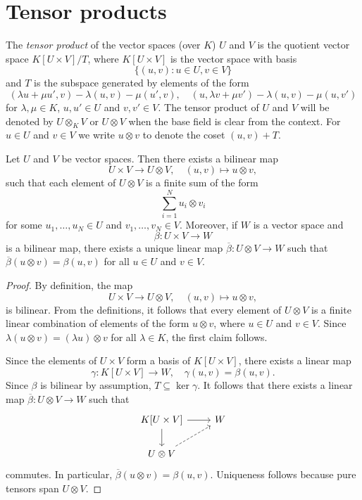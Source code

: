 \section{Tensor products}

The \emph{tensor product} of the vector spaces (over $K$) $U$ and $V$ 
is the quotient vector space $K[U\times V]/T$, where $K[U\times V]$ 
is the vector space with basis 
\[
\{(u,v):u\in U,v\in V\}
\]
and $T$ is the subspace 
generated by elements of the form 
\[
		(\lambda u+\mu u',v)-\lambda(u,v)-\mu(u',v),\quad
		(u,\lambda v+\mu v')-\lambda(u,v)-\mu(u,v')
	\]
for $\lambda,\mu\in K$, $u,u'\in U$ and $v,v'\in V$.
The tensor product of $U$ and $V$ will be denoted by $U\otimes_KV$ or 
$U\otimes V$ when the base field is clear from the context. For $u\in U$ and 
$v\in V$ we write $u\otimes v$ to denote the coset $(u,v)+T$.

\begin{theorem}
	Let $U$ and $V$ be vector spaces. Then there exists a bilinear map 
	\[
    U\times V\to U\otimes V,\quad (u,v)\mapsto u\otimes v,
    \]
    such that 
	each element of $U\otimes V$ is a finite sum of the form 
	\[
		\sum_{i=1}^N u_i\otimes v_i
	\]
	for some $u_1,\dots,u_N\in U$ and $v_1,\dots,v_N\in V$. 
	Moreover, if $W$ is a vector space and 
 \[
 \beta\colon U\times V\to W
 \]
 is a bilinear map, 
	there exists a unique linear map 
	$\overline{\beta}\colon U\otimes V\to W$ such that $\overline{\beta}(u\otimes
	v)=\beta(u,v)$ for all $u\in U$ and $v\in V$. 
\end{theorem}

\begin{proof}
    By definition, the map
    \[
	U\times V\to U\otimes V,\quad
	(u,v)\mapsto u\otimes v,
	\]
	is bilinear. From the definitions, it follows that every element of 
	$U\otimes V$ is a finite linear combination of elements of the form 
	$u\otimes v$, where $u\in U$ and $v\in V$. Since $\lambda(u\otimes
	v)=(\lambda u)\otimes v$ for all $\lambda\in K$, the first claim follows.

	Since the elements of $U\times V$ form a basis of $K[U\times V]$, there exists
	a linear map 
	\[
		\gamma\colon K[U\times V]\to W,\quad
	\gamma(u,v)=\beta(u,v). 
	\]
	Since $\beta$ is bilinear by assumption, $T\subseteq\ker\gamma$. It follows that there exists 
	a linear map $\overline{\beta}\colon U\otimes V\to
	W$ such that  
	\[
	\begin{tikzcd}
		K[U\times V] \arrow[r]\arrow[d] & W \\
		U\otimes V\arrow[ur, dashrightarrow]
	\end{tikzcd}
	\]
	commutes. In particular, $\overline{\beta}(u\otimes v)=\beta(u,v)$. Uniqueness follows because pure tensors span $U\otimes V$. 
\end{proof}

